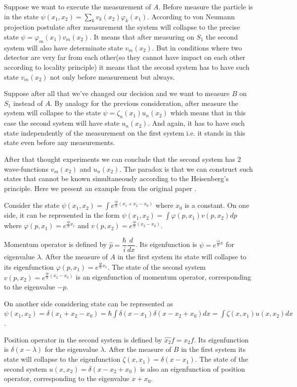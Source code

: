 \documentclass[11pt]{article}
\begin{document}
Suppose we want to execute the measurement of $A$. Before measure the particle is in the state $\psi(x_1, x_2) = \sum_k v_k(x_2)\varphi_k(x_1)$. According to von Neumann projection postulate after measurement the system will collapse to the precise state $\psi = \varphi_m(x_1)v_m(x_2)$. It means that after measuring on $S_1$ the second system will also have determinate state $v_m(x_2)$. But in conditions where two detector are very far from each other(so they cannot have impact on each other according to locality principle) it means that the second system has to have such state $v_m(x_2)$ not only before measurement but always.

Suppose after all that we've changed our decision and we want to measure $B$ on $S_1$ instead of $A$. By analogy for the previous consideration, after measure the system will collapse to the state $\psi = \zeta_n(x_1)u_n(x_2)$ which means that in this case the second system will have state $u_n(x_2)$. And again, it has to have such state independently of the measurement on the first system i.e. it stands in this state even before any measurements.

After that thought experiments we can conclude that the second system has 2 wave-functions $v_m(x_2)$ and $u_n(x_2)$. The paradox is that we can construct such states that cannot be known simultaneously according to the Heisenberg's principle. Here we present an example from the original paper \cite{EPR}.

Consider the state $\psi(x_1, x_2) = \int e^{\frac{ip}{\hbar}(x_1+x_2-x_0)}$ where $x_0$ is a constant. On one side, it can be represented in the form $\psi(x_1, x_2) = \int\varphi(p, x_1)v(p, x_2)dp$ where $\varphi(p, x_1) = e^{\frac{ip}{\hbar}x_1}$ and $v(p, x_2) = e^{\frac{ip}{\hbar}(x_2-x_0)}$. 

Momentum operator is defined by $\hat{p} = \dfrac{\hbar}{i}\dfrac{d}{dx}$. Its eigenfunction is $\psi = e^{\frac{i\lambda}{\hbar}x}$ for eigenvalue $\lambda$. After the measure of $A$ in the first system its state will collapse to its eigenfunction $\varphi(p, x_1) = e^{\frac{ip}{\hbar}x_1}$. The state of the second system $v(p, x_2) = e^{\frac{ip}{\hbar}(x_2-x_0)}$ is an eigenfunction of momentum operator, corresponding to the eigenvalue $-p$. 

On another side considering state can be represented as $\psi(x_1, x_2) = \delta(x_1 + x_2 - x_0) = \hbar\int\delta(x - x_1)\delta (x - x_2 + x_0)dx = \int\zeta(x, x_1)u(x, x_2)dx$. 

Position operator in the second system is defined by $\hat{x_2}f = x_2f$. Its eigenfunction is $\delta(x - \lambda)$ for the eigenvalue $\lambda$. After the measure of $B$ in the first system its state will collapse to the eigenfunction $\zeta(x, x_1) = \delta(x - x_1)$. The state of the second system $u(x, x_2) = \delta(x - x_2 + x_0)$ is also an eigenfunction of position operator, corresponding to the eigenvalue $x + x_0$.
\end{document}
